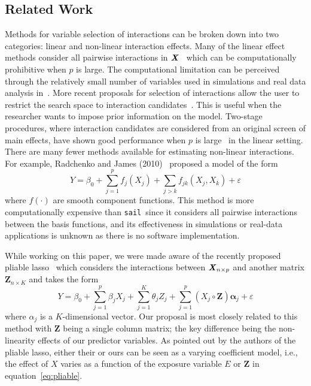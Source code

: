 \documentclass[12pt,letter]{article}\usepackage[]{graphicx}\usepackage[]{color}
\newcommand{\sail}{\texttt{sail}}
\newcommand{\bX}{\textbf{\emph{X}}}
\newcommand{\balpha}{\boldsymbol{\alpha}}
\newcommand{\mb}[1]{\mathbf{#1}}
\begin{document}
\subsection{Related Work}
Methods for variable selection of interactions can be broken down into two categories: linear and non-linear interaction effects. 
Many of the linear effect methods consider all pairwise interactions in $\bX$~\citep{zhao2009composite,choi2010variable,bien2013lasso, she2014group} which can be computationally prohibitive when $p$ is large. The computational limitation can be perceived through the relatively small number of variables used in simulations and real data analysis in~\citep{zhao2009composite,choi2010variable,bien2013lasso, she2014group}. 
More recent proposals for selection of interactions allow the user to restrict the search space to interaction candidates~\citep{lim2015learning,haris2016convex}. This is useful when the researcher wants to impose prior information on the model. 
Two-stage procedures, where interaction candidates are considered from an original screen of main effects, have shown good performance when $p$ is large~\citep{hao2018model,shah2016modelling} in the linear setting.  
There are many fewer methods available for estimating non-linear interactions. For example, Radchenko and James (2010)~\citep{radchenko2010variable} proposed a model of the form
\[Y = \beta_0 + \sum_{j=1}^{p} f_j(X_j) + \sum_{j>k}f_{jk}(X_j, X_k) + \varepsilon\]
where $f(\cdot)$ are smooth component functions. This method is more computationally expensive than \sail ~since it considers all pairwise interactions between the basis functions, and its effectiveness in simulations or real-data applications is unknown as there is no software implementation.  

While working on this paper, we were made aware of the recently proposed pliable lasso~\citep{tibshirani2017pliable} which considers the interactions between $\bX_{n \times p}$ and another matrix $\mathbf{Z}_{n\times K}$ and takes the form
\begin{equation}
Y = \beta_0 + \sum_{j=1}^{p}\beta_j X_j + \sum_{j=1}^{K}\theta_j Z_j + \sum_{j=1}^{p} (X_j \circ \mathbf{Z}) \balpha_j + \varepsilon \label{eq:pliable}
\end{equation} 
where $\alpha_j$ is a $K$-dimensional vector. 
Our proposal is most closely related to this method with $\mathbf{Z}$ being a single column matrix; the key difference being the non-linearity effects of our predictor variables. 
As pointed out by the authors of the pliable lasso, either their or ours can be seen as a varying coefficient model, i.e., the effect of $X$ varies as a function of the exposure variable $E$ or $\mb{Z}$ in equation~\ref{eq:pliable}. 
\end{document}
